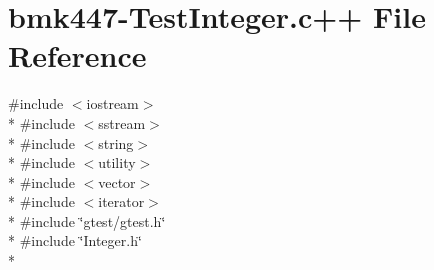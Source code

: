 \hypertarget{bmk447-TestInteger_8c_09_09}{\section{bmk447-\/\-Test\-Integer.c++ File Reference}
\label{bmk447-TestInteger_8c_09_09}
}
{\ttfamily \#include $<$iostream$>$}\\*
{\ttfamily \#include $<$sstream$>$}\\*
{\ttfamily \#include $<$string$>$}\\*
{\ttfamily \#include $<$utility$>$}\\*
{\ttfamily \#include $<$vector$>$}\\*
{\ttfamily \#include $<$iterator$>$}\\*
{\ttfamily \#include \char`\"{}gtest/gtest.\-h\char`\"{}}\\*
{\ttfamily \#include \char`\"{}Integer.\-h\char`\"{}}\\*
